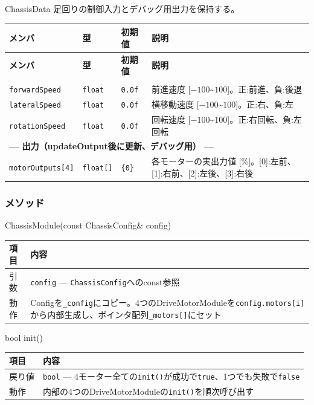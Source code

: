 \begin{funcblock}{ChassisData}
足回りの制御入力とデバッグ用出力を保持する。

\begin{longtable}{l l l p{4.0cm}}
\toprule
\textbf{メンバ} & \textbf{型} & \textbf{初期値} & \textbf{説明} \\
\midrule
\endfirsthead
\toprule
\textbf{メンバ} & \textbf{型} & \textbf{初期値} & \textbf{説明} \\
\midrule
\endhead
\bottomrule
\endlastfoot
\multicolumn{4}{l}{\textbf{--- 入力（ロジックフェーズで設定） ---}} \\
\texttt{forwardSpeed}  & \texttt{float} & \texttt{0.0f} & 前進速度 [$-100$\textasciitilde$100$]。正:前進、負:後退 \\
\texttt{lateralSpeed}  & \texttt{float} & \texttt{0.0f} & 横移動速度 [$-100$\textasciitilde$100$]。正:右、負:左 \\
\texttt{rotationSpeed} & \texttt{float} & \texttt{0.0f} & 回転速度 [$-100$\textasciitilde$100$]。正:右回転、負:左回転 \\
\midrule
\multicolumn{4}{l}{\textbf{--- 出力（updateOutput後に更新、デバッグ用） ---}} \\
\texttt{motorOutputs[4]} & \texttt{float[]} & \texttt{\{0\}} & 各モーターの実出力値 [\%]。[0]:左前、[1]:右前、[2]:左後、[3]:右後 \\
\end{longtable}
\end{funcblock}

\subsubsection{メソッド}

\begin{funcblock}{ChassisModule(const ChassisConfig\& config)}
\begin{tabularx}{\textwidth}{l X}
\toprule
\textbf{項目} & \textbf{内容} \\
\midrule
引数   & \texttt{config} --- \texttt{ChassisConfig}へのconst参照 \\
動作   & Configを\texttt{\_config}にコピー。4つのDriveMotorModuleを\texttt{config.motors[i]}から内部生成し、ポインタ配列\texttt{\_motors[]}にセット \\
\bottomrule
\end{tabularx}
\end{funcblock}

\begin{funcblock}{bool init()}
\begin{tabularx}{\textwidth}{l X}
\toprule
\textbf{項目} & \textbf{内容} \\
\midrule
戻り値   & \texttt{bool} --- 4モーター全ての\texttt{init()}が成功で\texttt{true}、1つでも失敗で\texttt{false} \\
動作     & 内部の4つのDriveMotorModuleの\texttt{init()}を順次呼び出す \\
\bottomrule
\end{tabularx}
\end{funcblock}

